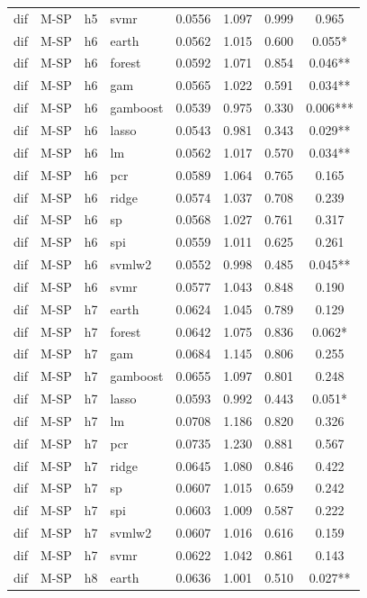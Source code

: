 \begin{ThreePartTable}
\begin{longtable}[t]{llclcccc}
dif & M-SP & h5 & svmr & 0.0556 & 1.097 & 0.999 & 0.965\\
\addlinespace
dif & M-SP & h6 & earth & 0.0562 & 1.015 & 0.600 & 0.055*\\
dif & M-SP & h6 & forest & 0.0592 & 1.071 & 0.854 & 0.046**\\
dif & M-SP & h6 & gam & 0.0565 & 1.022 & 0.591 & 0.034**\\
dif & M-SP & h6 & gamboost & 0.0539 & 0.975 & 0.330 & 0.006***\\
dif & M-SP & h6 & lasso & 0.0543 & 0.981 & 0.343 & 0.029**\\
dif & M-SP & h6 & lm & 0.0562 & 1.017 & 0.570 & 0.034**\\
dif & M-SP & h6 & pcr & 0.0589 & 1.064 & 0.765 & 0.165\\
dif & M-SP & h6 & ridge & 0.0574 & 1.037 & 0.708 & 0.239\\
dif & M-SP & h6 & sp & 0.0568 & 1.027 & 0.761 & 0.317\\
dif & M-SP & h6 & spi & 0.0559 & 1.011 & 0.625 & 0.261\\
dif & M-SP & h6 & svmlw2 & 0.0552 & 0.998 & 0.485 & 0.045**\\
dif & M-SP & h6 & svmr & 0.0577 & 1.043 & 0.848 & 0.190\\
\addlinespace
dif & M-SP & h7 & earth & 0.0624 & 1.045 & 0.789 & 0.129\\
dif & M-SP & h7 & forest & 0.0642 & 1.075 & 0.836 & 0.062*\\
dif & M-SP & h7 & gam & 0.0684 & 1.145 & 0.806 & 0.255\\
dif & M-SP & h7 & gamboost & 0.0655 & 1.097 & 0.801 & 0.248\\
dif & M-SP & h7 & lasso & 0.0593 & 0.992 & 0.443 & 0.051*\\
dif & M-SP & h7 & lm & 0.0708 & 1.186 & 0.820 & 0.326\\
dif & M-SP & h7 & pcr & 0.0735 & 1.230 & 0.881 & 0.567\\
dif & M-SP & h7 & ridge & 0.0645 & 1.080 & 0.846 & 0.422\\
dif & M-SP & h7 & sp & 0.0607 & 1.015 & 0.659 & 0.242\\
dif & M-SP & h7 & spi & 0.0603 & 1.009 & 0.587 & 0.222\\
dif & M-SP & h7 & svmlw2 & 0.0607 & 1.016 & 0.616 & 0.159\\
dif & M-SP & h7 & svmr & 0.0622 & 1.042 & 0.861 & 0.143\\
\addlinespace
dif & M-SP & h8 & earth & 0.0636 & 1.001 & 0.510 & 0.027**\\

\end{longtable}
\end{ThreePartTable}
